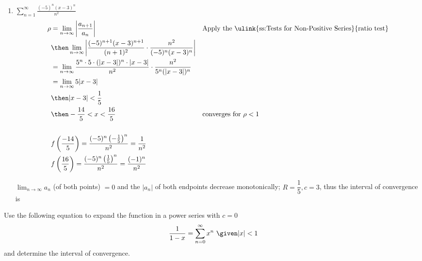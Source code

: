 \begin{enumerate}[itemsep=24em]
\newpage %

  \item \(\displaystyle \sum_{n=1}^{\infty} \frac{(-5)^n(x-3)^n}{n^2} \)
    \begin{align*}
      \rho &= \lim_{n \to \infty} \left| \frac{a_{n+1}}{a_n}  \right|
           && \text{Apply the \ulink{ss:Tests for Non-Positive Series}{ratio test}} \\
      &\then \lim_{n \to \infty} \left|
      \frac{(-5)^{n+1} (x-3)^{n+1}}{(n+1)^2} \cdot
      \frac{n^2}{(-5)^n(x-3)^n}
      \right| \\
      &= \lim_{n \to \infty}
      \frac{5^n\cdot 5 \cdot (|x-3|)^{n} \cdot |x-3|}{n^2} \cdot
      \frac{n^2}{5^n(|x-3|)^n} \\
      &=\lim_{n \to \infty} 5|x-3| \\
      &\then |x-3| < \frac{1}{5} \\
      &\then -\frac{14}{5} < x < \frac{16}{5}
      && \text{converges for}~\rho < 1 \\
      \\
      &f\left(\frac{-14}{5}\right) = \frac{(-5)^n\left(-\frac{1}{5}\right)^n}{n^2} = \frac{1}{n^2}
      \\
      &f\left(\frac{16}{5}\right) = \frac{(-5)^n\left(\frac{1}{5}\right)^n}{n^2} = \frac{(-1)^n}{n^2}
    \end{align*}

    \(\lim_{n \to \infty}  a_n\) (of both points) \(= 0\) and the \(|a_n|\) of both
    endpoints decrease monotonically; \(R = \dfrac{1}{5}, c = 3\), thus the
    interval of convergence is 

\end{enumerate}

\newpage %

Use the following equation to expand the function in a power series with \(c =
0\) \[~\displaystyle \frac{1}{1-x} = \sum_{n=0}^{\infty} x^n ~\given |x| < 1 \]
and determine the interval of convergence.

